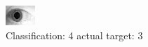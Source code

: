 \begin{figure}[h!]
\begin{center}
\includegraphics[width=0.60\columnwidth]{figures/ID1881_class_4_target_3.png}
\end{center}
\caption{ Classification: 4 actual target: 3}
\label{fig:ID1881_class_4_target_3}
\end{figure}
